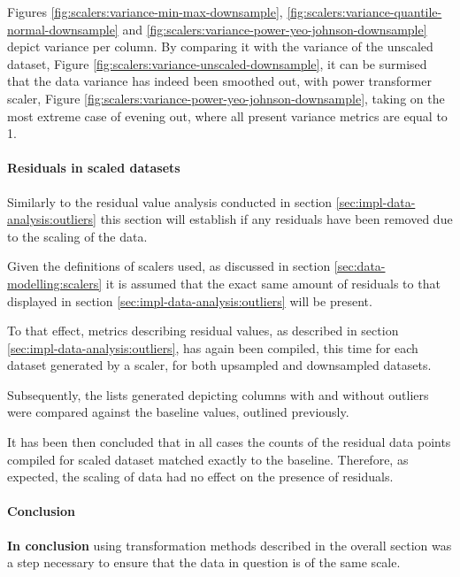 Figures \ref{fig:scalers:variance-min-max-downsample}, \ref{fig:scalers:variance-quantile-normal-downsample} and \ref{fig:scalers:variance-power-yeo-johnson-downsample} depict variance per column. By comparing it with the variance of the unscaled dataset, Figure \ref{fig:scalers:variance-unscaled-downsample}, it can be surmised that the data variance has indeed been smoothed out, with power transformer scaler, Figure \ref{fig:scalers:variance-power-yeo-johnson-downsample}, taking on the most extreme case of evening out, where all present variance metrics are equal to 1.
\FloatBarrier

\paragraph{Residuals in scaled datasets}\label{sec:scalers:outliers}
Similarly to the residual value analysis conducted in section \ref{sec:impl-data-analysis:outliers} this section will establish if any residuals have been removed due to the scaling of the data. 

Given the definitions of scalers used, as discussed in section \ref{sec:data-modelling:scalers} it is assumed that the exact same amount of residuals to that displayed in section \ref{sec:impl-data-analysis:outliers} will be present. 

To that effect, metrics describing residual values, as described in section \ref{sec:impl-data-analysis:outliers}, has again been compiled, this time for each dataset generated by a scaler, for both upsampled and downsampled datasets.

Subsequently, the lists generated depicting columns with and without outliers were compared against the baseline values, outlined previously. 

It has been then concluded that in all cases the counts of the residual data points compiled for scaled dataset matched exactly to the baseline. Therefore, as expected, the scaling of data had no effect on the presence of residuals.

\paragraph{Conclusion}\label{sec:scalers:conclusion}
\textbf{In conclusion} using transformation methods described in the overall section was a step necessary to ensure that the data in question is of the same scale. 

\FloatBarrier
